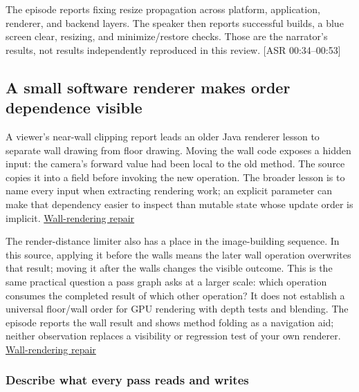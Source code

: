 The episode reports fixing resize propagation across platform, application, renderer, and backend layers. The speaker then reports successful builds, a blue screen clear, resizing, and minimize/restore checks. Those are the narrator's results, not results independently reproduced in this review. {[}ASR 00:34--00:53{]}

\subsection{A small software renderer makes order dependence visible}\label{06-engine-ii-ch026-a-small-software-renderer-makes-order-dependence-visible}

\hypertarget{06-engine-ii-ch026-a-small-software-renderer-makes-order-dependence-visible}{}

A viewer's near-wall clipping report leads an older Java renderer lesson to separate wall drawing from floor drawing. Moving the wall code exposes a hidden input: the camera's forward value had been local to the old method. The source copies it into a field before invoking the new operation. The broader lesson is to name every input when extracting rendering work; an explicit parameter can make that dependency easier to inspect than mutable state whose update order is implicit. \href{https://www.youtube.com/watch?v=98K5Bm2sApY}{Wall-rendering repair}

The render-distance limiter also has a place in the image-building sequence. In this source, applying it before the walls means the later wall operation overwrites that result; moving it after the walls changes the visible outcome. This is the same practical question a pass graph asks at a larger scale: which operation consumes the completed result of which other operation? It does not establish a universal floor/wall order for GPU rendering with depth tests and blending. The episode reports the wall result and shows method folding as a navigation aid; neither observation replaces a visibility or regression test of your own renderer. \href{https://www.youtube.com/watch?v=98K5Bm2sApY}{Wall-rendering repair}

\subsubsection{Describe what every pass reads and writes}\label{06-engine-ii-ch026-describe-what-every-pass-reads-and-writes}

\hypertarget{06-engine-ii-ch026-describe-what-every-pass-reads-and-writes}{}

